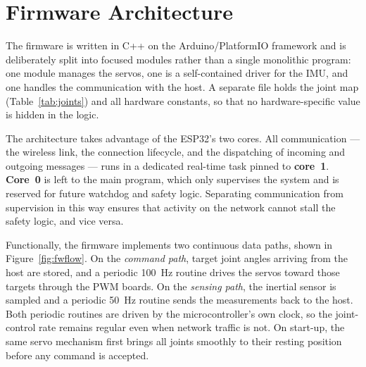 \section{Firmware Architecture}
\label{sec:fw-arch}
The firmware is written in C++ on the Arduino/PlatformIO framework and is
deliberately split into focused modules rather than a single monolithic
program: one module manages the servos, one is a self-contained driver
for the IMU, and one handles the communication with the host. A separate
file holds the joint map (Table~\ref{tab:joints}) and all hardware
constants, so that no hardware-specific value is hidden in the logic.

The architecture takes advantage of the ESP32's two cores. All
communication --- the wireless link, the connection lifecycle, and the
dispatching of incoming and outgoing messages --- runs in a dedicated
real-time task pinned to \textbf{core~1}. \textbf{Core~0} is left to the
main program, which only supervises the system and is reserved for future
watchdog and safety logic. Separating communication from supervision in
this way ensures that activity on the network cannot stall the safety
logic, and vice versa.

Functionally, the firmware implements two continuous data paths, shown in
Figure~\ref{fig:fwflow}. On the \emph{command path}, target joint angles
arriving from the host are stored, and a periodic 100~Hz routine drives
the servos toward those targets through the PWM boards. On the
\emph{sensing path}, the inertial sensor is sampled and a periodic 50~Hz
routine sends the measurements back to the host. Both periodic routines
are driven by the microcontroller's own clock, so the joint-control rate
remains regular even when network traffic is not. On start-up, the same
servo mechanism first brings all joints smoothly to their resting
position before any command is accepted.

